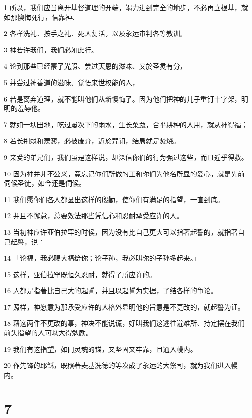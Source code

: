 \par 1 所以，我们应当离开基督道理的开端，竭力进到完全的地步，不必再立根基，就如那懊悔死行，信靠神、
\par 2 各样洗礼、按手之礼、死人复活，以及永远审判各等教训。
\par 3 神若许我们，我们必如此行。
\par 4 论到那些已经蒙了光照、尝过天恩的滋味、又於圣灵有分，
\par 5 并尝过神善道的滋味、觉悟来世权能的人，
\par 6 若是离弃道理，就不能叫他们从新懊悔了。因为他们把神的儿子重钉十字架，明明的羞辱他。
\par 7 就如一块田地，吃过屡次下的雨水，生长菜蔬，合乎耕种的人用，就从神得福；
\par 8 若长荆棘和蒺藜，必被废弃，近於咒诅，结局就是焚烧。
\par 9 亲爱的弟兄们，我们虽是这样说，却深信你们的行为强过这些，而且近乎得救。
\par 10 因为神并非不公义，竟忘记你们所做的工和你们为他名所显的爱心，就是先前伺候圣徒，如今还是伺候。
\par 11 我们愿你们各人都显出这样的殷勤，使你们有满足的指望，一直到底。
\par 12 并且不懈怠，总要效法那些凭信心和忍耐承受应许的人。
\par 13 当初神应许亚伯拉罕的时候，因为没有比自己更大可以指著起誓的，就指著自己起誓，说：
\par 14 「论福，我必赐大福给你；论子孙，我必叫你的子孙多起来。」
\par 15 这样，亚伯拉罕既恒久忍耐，就得了所应许的。
\par 16 人都是指著比自己大的起誓，并且以起誓为实据，了结各样的争论。
\par 17 照样，神愿意为那承受应许的人格外显明他的旨意是不更改的，就起誓为证。
\par 18 藉这两件不更改的事，神决不能说谎，好叫我们这逃往避难所、持定摆在我们前头指望的人可以大得勉励。
\par 19 我们有这指望，如同灵魂的锚，又坚固又牢靠，且通入幔内。
\par 20 作先锋的耶稣，既照著麦基洗德的等次成了永远的大祭司，就为我们进入幔内。

\chapter{7}

